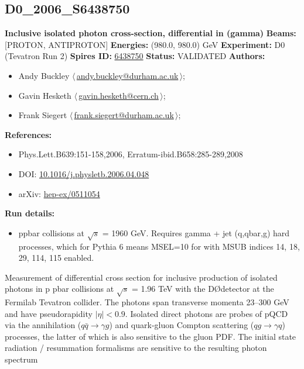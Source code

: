 \subsection[D0\_2006\_S6438750]{D0\_2006\_S6438750\,\cite{Abazov:2005wc}}
\textbf{Inclusive isolated photon cross-section, differential in \pT(gamma)}\newline
\textbf{Beams:} [PROTON, ANTIPROTON] \newline
\textbf{Energies:} (980.0, 980.0) GeV \newline
\textbf{Experiment:} D0 (Tevatron Run 2) \newline
\textbf{Spires ID:} \href{http://www.slac.stanford.edu/spires/find/hep/www?rawcmd=key+6438750}{6438750}\newline
\textbf{Status:} VALIDATED\newline
\textbf{Authors:}
\begin{itemize}
  \item Andy Buckley $\langle\,$\href{mailto:andy.buckley@durham.ac.uk}{andy.buckley@durham.ac.uk}$\,\rangle$;
  \item Gavin Hesketh $\langle\,$\href{mailto:gavin.hesketh@cern.ch}{gavin.hesketh@cern.ch}$\,\rangle$;
  \item Frank Siegert $\langle\,$\href{mailto:frank.siegert@durham.ac.uk}{frank.siegert@durham.ac.uk}$\,\rangle$;
\end{itemize}
\textbf{References:}
\begin{itemize}
  \item Phys.Lett.B639:151-158,2006, Erratum-ibid.B658:285-289,2008
  \item DOI: \href{http://dx.doi.org/10.1016/j.physletb.2006.04.048}{10.1016/j.physletb.2006.04.048}
  \item arXiv: \href{http://arxiv.org/abs/hep-ex/0511054}{hep-ex/0511054}
\end{itemize}
\textbf{Run details:}
\begin{itemize}

  \item ppbar collisions at \ensuremath{\sqrt{s}} = 1960 GeV. Requires gamma + jet (q,qbar,g) hard processes, which for Pythia 6 means MSEL=10 for with MSUB indices 14, 18, 29, 114, 115 enabled.\end{itemize}

\noindent Measurement of differential cross section for inclusive production of isolated photons in p pbar collisions at \ensuremath{\sqrt{s}} = 1.96 TeV with the D\O detector at the Fermilab Tevatron collider. The photons span transverse momenta 23--300 GeV and have pseudorapidity $|\eta| < 0.9$. Isolated direct photons are probes of pQCD via the annihilation ($q \bar{q} \ensuremath{\to} \gamma g$) and quark-gluon Compton scattering ($q g \ensuremath{\to} \gamma q$) processes, the latter of which is also sensitive to the gluon PDF. The initial state radiation / resummation formalisms are sensitive to the resulting photon \pT spectrum

